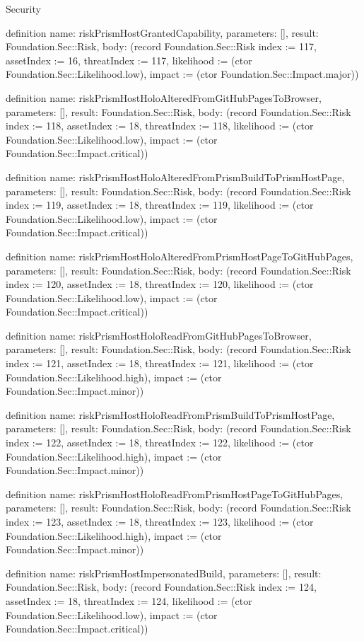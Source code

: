 \begin{lexlean}{Security}
\begin{semanticmodule}
definition{
  name: riskPrismHostGrantedCapability,
  parameters: [],
  result: Foundation.Sec::Risk,
  body: (record Foundation.Sec::Risk {index := 117, assetIndex := 16, threatIndex := 117, likelihood := (ctor Foundation.Sec::Likelihood.low), impact := (ctor Foundation.Sec::Impact.major)})
}

definition{
  name: riskPrismHostHoloAlteredFromGitHubPagesToBrowser,
  parameters: [],
  result: Foundation.Sec::Risk,
  body: (record Foundation.Sec::Risk {index := 118, assetIndex := 18, threatIndex := 118, likelihood := (ctor Foundation.Sec::Likelihood.low), impact := (ctor Foundation.Sec::Impact.critical)})
}

definition{
  name: riskPrismHostHoloAlteredFromPrismBuildToPrismHostPage,
  parameters: [],
  result: Foundation.Sec::Risk,
  body: (record Foundation.Sec::Risk {index := 119, assetIndex := 18, threatIndex := 119, likelihood := (ctor Foundation.Sec::Likelihood.low), impact := (ctor Foundation.Sec::Impact.critical)})
}

definition{
  name: riskPrismHostHoloAlteredFromPrismHostPageToGitHubPages,
  parameters: [],
  result: Foundation.Sec::Risk,
  body: (record Foundation.Sec::Risk {index := 120, assetIndex := 18, threatIndex := 120, likelihood := (ctor Foundation.Sec::Likelihood.low), impact := (ctor Foundation.Sec::Impact.critical)})
}

definition{
  name: riskPrismHostHoloReadFromGitHubPagesToBrowser,
  parameters: [],
  result: Foundation.Sec::Risk,
  body: (record Foundation.Sec::Risk {index := 121, assetIndex := 18, threatIndex := 121, likelihood := (ctor Foundation.Sec::Likelihood.high), impact := (ctor Foundation.Sec::Impact.minor)})
}

definition{
  name: riskPrismHostHoloReadFromPrismBuildToPrismHostPage,
  parameters: [],
  result: Foundation.Sec::Risk,
  body: (record Foundation.Sec::Risk {index := 122, assetIndex := 18, threatIndex := 122, likelihood := (ctor Foundation.Sec::Likelihood.high), impact := (ctor Foundation.Sec::Impact.minor)})
}

definition{
  name: riskPrismHostHoloReadFromPrismHostPageToGitHubPages,
  parameters: [],
  result: Foundation.Sec::Risk,
  body: (record Foundation.Sec::Risk {index := 123, assetIndex := 18, threatIndex := 123, likelihood := (ctor Foundation.Sec::Likelihood.high), impact := (ctor Foundation.Sec::Impact.minor)})
}

definition{
  name: riskPrismHostImpersonatedBuild,
  parameters: [],
  result: Foundation.Sec::Risk,
  body: (record Foundation.Sec::Risk {index := 124, assetIndex := 18, threatIndex := 124, likelihood := (ctor Foundation.Sec::Likelihood.low), impact := (ctor Foundation.Sec::Impact.critical)})
}


\end{semanticmodule}
\end{lexlean}
